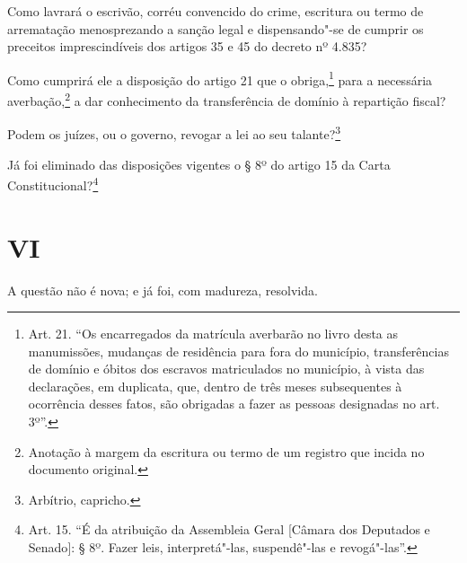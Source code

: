 
Como lavrará o escrivão, corréu convencido do crime, escritura ou termo
de arrematação menosprezando a sanção legal e dispensando"-se de cumprir
os preceitos imprescindíveis dos artigos 35 e 45 do decreto nº 4.835?


Como cumprirá ele a disposição do artigo 21 que o obriga,\footnote{
  Art. 21. ``Os encarregados da matrícula averbarão no livro desta as
  manumissões, mudanças de residência para fora do município,
  transferências de domínio e óbitos dos escravos matriculados no
  município, à vista das declarações, em duplicata, que, dentro de três
  meses subsequentes à ocorrência desses fatos, são obrigadas a fazer as
  pessoas designadas no art. 3º''.} para a necessária averbação,\footnote{
  Anotação à margem da escritura ou termo de um registro que incida no
  documento original.} a dar conhecimento da transferência de domínio à
repartição fiscal?


Podem os juízes, ou o governo, revogar a lei ao seu talante?\footnote{
  Arbítrio, capricho.}

Já foi eliminado das disposições vigentes o § 8º do artigo 15 da Carta
Constitucional?\footnote{Art. 15. ``É da atribuição da Assembleia Geral
  {[}Câmara dos Deputados e Senado{]}: § 8º. Fazer leis, interpretá"-las,
  suspendê"-las e revogá"-las''.}

\section*{VI}

A questão não é nova; e já foi, com madureza, resolvida.

